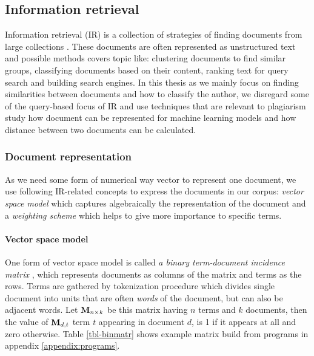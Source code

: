 \subsection{Information retrieval} \label{chap-IR}

Information retrieval (IR) is a collection of strategies of finding documents from large collections \cite{Manning:2008:IIR:1394399}. These documents are often represented as unstructured text and possible methods covers topic like: clustering documents to find similar groups, classifying documents based on their content, ranking text for query search and building search engines. In this thesis as we mainly focus on finding similarities between documents and how to classify the author, we disregard some of the query-based focus of IR and use techniques that are relevant to plagiarism study \ie how document can be represented for machine learning models and how distance between two documents can be calculated.




\subsubsection{Document representation} \label{chap-IR-document-repr}

As we need some form of numerical way \ie vector to represent one document, we use following IR-related concepts to express the documents in our corpus: \emph{vector space model} which captures algebraically the representation of the document and a \emph{weighting scheme} which helps to give more importance to specific terms.


\paragraph{Vector space model}

One form of vector space model is called \emph{a binary term-document incidence matrix} \cite{Manning:2008:IIR:1394399}, which represents documents as columns of the matrix and terms as the rows. Terms are gathered by tokenization procedure which divides single document into units that are often \emph{words} of the document, but can also be \eg adjacent words. Let $\mathbf{M}_{n \times k}$ be this matrix having $n$ terms and $k$ documents, then the value of $\mathbf{M}_{d, t}$ \ie term $t$ appearing in document $d$, is 1 if it appears at all and zero otherwise. Table \ref{tbl-binmatr} shows example matrix build from programs in appendix \ref{appendix:programs}.  

